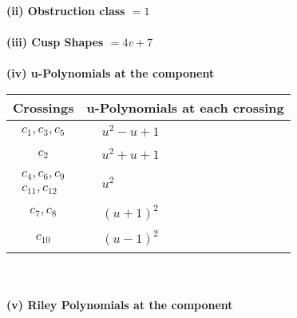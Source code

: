 \documentclass[1p]{elsarticle_modified}
\theoremstyle{definition}
\begin{document}
\flushleft \textbf{(ii) Obstruction class $= 1$}\\~\\
\flushleft \textbf{(iii) Cusp Shapes $= 4 v+7$}\\~\\
\newpage\renewcommand{\arraystretch}{1}
\flushleft \textbf{(iv) u-Polynomials at the component}\newline \\
\begin{tabular}{m{50pt}|m{274pt}}
Crossings & \hspace{64pt}u-Polynomials at each crossing \\
\hline $$\begin{aligned}c_{1},c_{3},c_{5}\end{aligned}$$&$\begin{aligned}
&u^2- u+1
\end{aligned}$\\
\hline $$\begin{aligned}c_{2}\end{aligned}$$&$\begin{aligned}
&u^2+u+1
\end{aligned}$\\
\hline $$\begin{aligned}c_{4},c_{6},c_{9}\\c_{11},c_{12}\end{aligned}$$&$\begin{aligned}
&u^2
\end{aligned}$\\
\hline $$\begin{aligned}c_{7},c_{8}\end{aligned}$$&$\begin{aligned}
&(u+1)^2
\end{aligned}$\\
\hline $$\begin{aligned}c_{10}\end{aligned}$$&$\begin{aligned}
&(u-1)^2
\end{aligned}$\\
\hline
\end{tabular}\\~\\
\newpage\renewcommand{\arraystretch}{1}
\flushleft \textbf{(v) Riley Polynomials at the component}\newline \\
\end{document}
